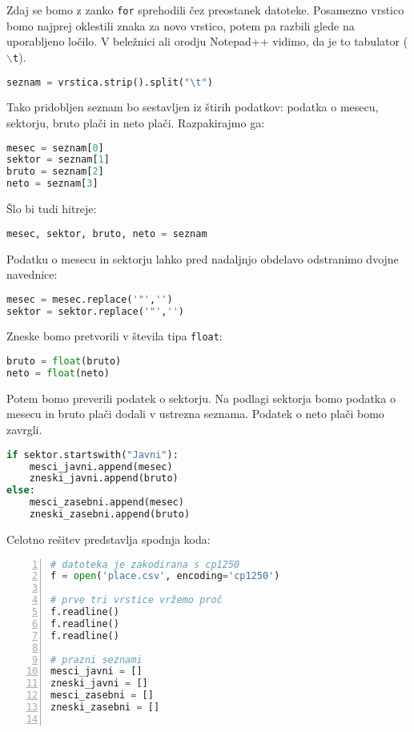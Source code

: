 \begin{resitev}
Zdaj se bomo z zanko \texttt{for} sprehodili čez preostanek datoteke. Posamezno vrstico bomo najprej oklestili znaka za novo vrstico, potem pa razbili glede na uporabljeno ločilo. V beležnici ali orodju Notepad++ vidimo, da je to tabulator (\texttt{$\backslash$t}).
\begin{lstlisting}[language=Python, showstringspaces=false]
seznam = vrstica.strip().split("\t")
\end{lstlisting}
Tako pridobljen seznam bo sestavljen iz štirih podatkov: podatka o mesecu, sektorju, bruto plači in neto plači. Razpakirajmo ga:
\begin{lstlisting}[language=Python, showstringspaces=false]
mesec = seznam[0]
sektor = seznam[1]
bruto = seznam[2]
neto = seznam[3]
\end{lstlisting}
Šlo bi tudi hitreje:
\begin{lstlisting}[language=Python, showstringspaces=false]
mesec, sektor, bruto, neto = seznam
\end{lstlisting}
Podatku o mesecu in sektorju lahko pred nadaljnjo obdelavo odstranimo dvojne navednice:
\begin{lstlisting}[language=Python, showstringspaces=false]
mesec = mesec.replace('"','')
sektor = sektor.replace('"','')
\end{lstlisting}
Zneske bomo pretvorili v števila tipa \texttt{float}:
\begin{lstlisting}[language=Python, showstringspaces=false]
bruto = float(bruto)
neto = float(neto)
\end{lstlisting}

Potem bomo preverili podatek o sektorju. Na podlagi sektorja bomo podatka o mesecu in bruto plači dodali v ustrezna seznama. Podatek o neto plači bomo zavrgli.
\begin{lstlisting}[language=Python, showstringspaces=false]
if sektor.startswith("Javni"):
    mesci_javni.append(mesec)
    zneski_javni.append(bruto)
else:
    mesci_zasebni.append(mesec)
    zneski_zasebni.append(bruto)
\end{lstlisting}

Celotno rešitev predstavlja spodnja koda:
\begin{lstlisting}[language=Python, showstringspaces=false,numbers=left]
# datoteka je zakodirana s cp1250
f = open('place.csv', encoding='cp1250')

# prve tri vrstice vržemo proč
f.readline()
f.readline()
f.readline()

# prazni seznami
mesci_javni = []
zneski_javni = []
mesci_zasebni = []
zneski_zasebni = []


\end{lstlisting}
\end{resitev}
